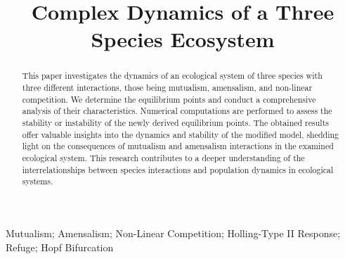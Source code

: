 \documentclass[]{interact}
\theoremstyle{plain}%
\theoremstyle{definition}
\theoremstyle{remark}
\numberwithin{equation}{section}
\begin{document}
\articletype{}%

\title{Complex Dynamics of a Three Species Ecosystem}

\author{
}

\maketitle


\begin{abstract}
This paper investigates the dynamics of an ecological system of three species with three different interactions, those being mutualism, amensalism, and non-linear competition. We determine the equilibrium points and conduct a comprehensive analysis of their characteristics. Numerical computations are performed to assess the stability or instability of the newly derived equilibrium points. The obtained results offer valuable insights into the dynamics and stability of the modified model, shedding light on the consequences of mutualism and amensalism interactions in the examined ecological system. This research contributes to a deeper understanding of the interrelationships between species interactions and population dynamics in ecological systems.
\end{abstract}

\begin{keywords}
Mutualism; Amensalism; Non-Linear Competition; Holling-Type II Response; Refuge; Hopf Bifurcation
\end{keywords}















\newpage
\appendix

\end{document}
